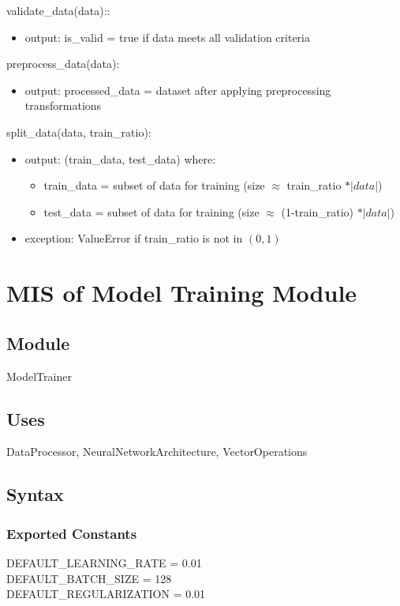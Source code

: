 \documentclass[12pt, titlepage]{article}
\begin{document}
\noindent validate\_data(data)::
\begin{itemize}
\item output: is\_valid = true if data meets all validation criteria
\end{itemize}

\noindent preprocess\_data(data):
\begin{itemize}
\item output: processed\_data = dataset after applying preprocessing transformations
\end{itemize}

\noindent split\_data(data, train\_ratio):
\begin{itemize}
\item output: (train\_data, test\_data) where:
\begin{itemize}
  \item train\_data = subset of data for training (size $\approx$ train\_ratio $* |data|$)
  \item test\_data = subset of data for training (size $\approx$ (1-train\_ratio) $* |data|$)
\end{itemize}
\item exception: ValueError if train\_ratio is not in $(0,1)$
\end{itemize}

\section{MIS of Model Training Module} \label{ModuleMT}

\subsection{Module}

ModelTrainer

\subsection{Uses}
DataProcessor, NeuralNetworkArchitecture, VectorOperations

\subsection{Syntax}

\subsubsection{Exported Constants}
DEFAULT\_LEARNING\_RATE = 0.01\\
DEFAULT\_BATCH\_SIZE = 128\\
DEFAULT\_REGULARIZATION = 0.01
\end{document}
